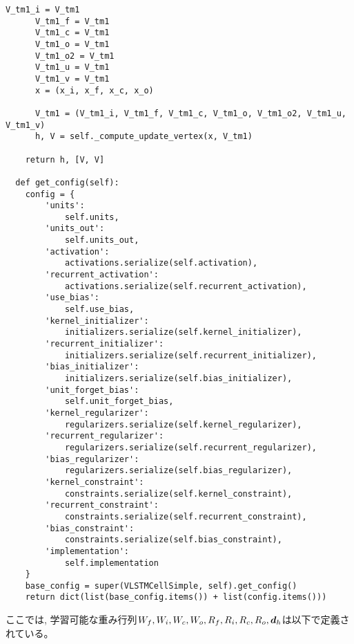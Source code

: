 \begin{lstlisting}[caption=独自のリカレントニューラルネットワーク構造の$1$ステップ, label=VLSTMCellSimple]
      V_tm1_i = V_tm1
      V_tm1_f = V_tm1
      V_tm1_c = V_tm1
      V_tm1_o = V_tm1
      V_tm1_o2 = V_tm1
      V_tm1_u = V_tm1
      V_tm1_v = V_tm1
      x = (x_i, x_f, x_c, x_o)

      V_tm1 = (V_tm1_i, V_tm1_f, V_tm1_c, V_tm1_o, V_tm1_o2, V_tm1_u, V_tm1_v)
      h, V = self._compute_update_vertex(x, V_tm1)

    return h, [V, V]

  def get_config(self):
    config = {
        'units':
            self.units,
        'units_out':
            self.units_out,
        'activation':
            activations.serialize(self.activation),
        'recurrent_activation':
            activations.serialize(self.recurrent_activation),
        'use_bias':
            self.use_bias,
        'kernel_initializer':
            initializers.serialize(self.kernel_initializer),
        'recurrent_initializer':
            initializers.serialize(self.recurrent_initializer),
        'bias_initializer':
            initializers.serialize(self.bias_initializer),
        'unit_forget_bias':
            self.unit_forget_bias,
        'kernel_regularizer':
            regularizers.serialize(self.kernel_regularizer),
        'recurrent_regularizer':
            regularizers.serialize(self.recurrent_regularizer),
        'bias_regularizer':
            regularizers.serialize(self.bias_regularizer),
        'kernel_constraint':
            constraints.serialize(self.kernel_constraint),
        'recurrent_constraint':
            constraints.serialize(self.recurrent_constraint),
        'bias_constraint':
            constraints.serialize(self.bias_constraint),
        'implementation':
            self.implementation
    }
    base_config = super(VLSTMCellSimple, self).get_config()
    return dict(list(base_config.items()) + list(config.items()))
\end{lstlisting}

ここでは, 学習可能な重み行列$W_f, W_i, W_c, W_o, R_f, R_i, R_c, R_o, {\mbox{\boldmath{$d$}}}_h$は以下で定義されている。

